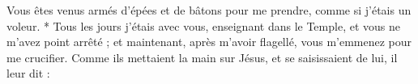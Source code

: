Vous êtes venus armés d’épées et de bâtons pour me prendre, comme si j’étais un voleur. * Tous les jours j’étais avec vous, enseignant dans le Temple, et vous ne m’avez point arrêté ; et maintenant, après m’avoir flagellé, vous m’emmenez pour me crucifier.
\versseparator
Comme ils mettaient la main sur Jésus, et se saisissaient de lui, il leur dit :